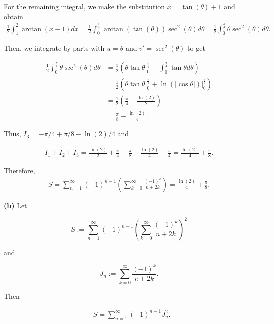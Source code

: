 \documentclass{article}
\begin{document}
For the remaining integral, we make the substitution $x=\tan(\theta)+1$ and obtain
\begin{align*}
   \frac{1}{2}\int_{1}^{2}\arctan(x-1)dx=\frac{1}{2}\int_{0}^{\frac{\pi}{4}}\arctan(\tan(\theta))\sec^2(\theta)d\theta=\frac{1}{2}\int_{0}^{\frac{\pi}{4}}\theta\sec^2(\theta)d\theta.
\end{align*}

Then, we integrate by parts with $u=\theta$ and $v'=\sec^2(\theta)$ to get

\begin{align*}
   \frac{1}{2}\int_{0}^{\frac{\pi}{4}}\theta\sec^2(\theta)d\theta&=\frac{1}{2}\left(\theta\tan\theta\Big|_{0}^{\frac{\pi}{4}}-\int_{0}^{\frac{\pi}{4}}\tan\theta d\theta\right) \\ 
   &=\frac{1}{2}\left(\theta\tan\theta\Big|_{0}^{\frac{\pi}{4}}+\ln(|\cos\theta|)\Big|_{0}^{\frac{\pi}{4}}\right) \\
   &=\frac{1}{2}\left(\frac{\pi}{4}-\frac{\ln(2)}{2}\right) \\
   &= \frac{\pi}{8}-\frac{\ln(2)}{4}.
\end{align*}

Thus, $I_3=-\pi/4+\pi/8-\ln(2)/4$ and

\begin{align*}
   I_1+I_2+I_3=\frac{\ln(2)}{2}+\frac{\pi}{4}+\frac{\pi}{8}-\frac{\ln(2)}{4}-\frac{\pi}{4}=\frac{\ln(2)}{4}+\frac{\pi}{8}.
\end{align*}

Therefore,
\begin{align*}
   S=\sum_{n=1}^{\infty}(-1)^{n-1}\left(\sum_{k=0}^{\infty}\frac{(-1)^k}{n+2k}\right)=\frac{\ln(2)}{4}+\frac{\pi}{8}.
\end{align*}
\vspace{5mm}

\textbf{(b)} Let 

\begin{equation*}
    S := \sum_{n=1}^{\infty}(-1)^{n-1}\left(\sum_{k=0}^{\infty}\frac{(-1)^k}{n+2k}\right)^2
\end{equation*}

and 

\begin{equation*}
    J_n := \sum_{k=0}^{\infty}\frac{(-1)^k}{n+2k}.
\end{equation*}

Then 

\begin{align*}
    &S=\sum_{n=1}^{\infty}(-1)^{n-1}J_n^2.
\end{align*}
\end{document}
